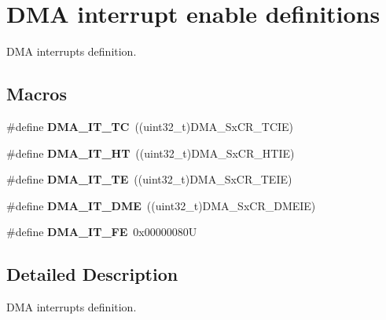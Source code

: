 \hypertarget{group___d_m_a__interrupt__enable__definitions}{}\section{D\+MA interrupt enable definitions}
\label{group___d_m_a__interrupt__enable__definitions}


D\+MA interrupts definition.  


\subsection*{Macros}
\begin{DoxyCompactItemize}
\item 
\mbox{\label{group___d_m_a__interrupt__enable__definitions_ga06e83dd277e0d3e5635cf8ce8dfd6e16}} 
\#define {\bfseries D\+M\+A\+\_\+\+I\+T\+\_\+\+TC}~((uint32\+\_\+t)D\+M\+A\+\_\+\+Sx\+C\+R\+\_\+\+T\+C\+IE)
\item 
\mbox{\label{group___d_m_a__interrupt__enable__definitions_gadf11c572b9797e04a14b105fdc2e5f66}} 
\#define {\bfseries D\+M\+A\+\_\+\+I\+T\+\_\+\+HT}~((uint32\+\_\+t)D\+M\+A\+\_\+\+Sx\+C\+R\+\_\+\+H\+T\+IE)
\item 
\mbox{\label{group___d_m_a__interrupt__enable__definitions_gaf9d92649d2a0146f663ff253d8f3b59e}} 
\#define {\bfseries D\+M\+A\+\_\+\+I\+T\+\_\+\+TE}~((uint32\+\_\+t)D\+M\+A\+\_\+\+Sx\+C\+R\+\_\+\+T\+E\+IE)
\item 
\mbox{\label{group___d_m_a__interrupt__enable__definitions_ga71137443f7bdced1ee80697596e9ea98}} 
\#define {\bfseries D\+M\+A\+\_\+\+I\+T\+\_\+\+D\+ME}~((uint32\+\_\+t)D\+M\+A\+\_\+\+Sx\+C\+R\+\_\+\+D\+M\+E\+IE)
\item 
\mbox{\label{group___d_m_a__interrupt__enable__definitions_ga93164ec039fc5579662c382e68d7d13f}} 
\#define {\bfseries D\+M\+A\+\_\+\+I\+T\+\_\+\+FE}~0x00000080U
\end{DoxyCompactItemize}


\subsection{Detailed Description}
D\+MA interrupts definition. 

